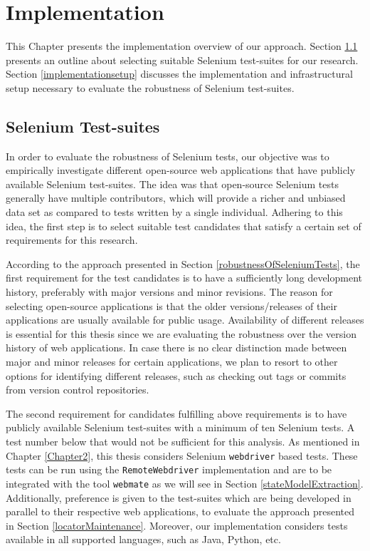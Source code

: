 \chapter{Implementation}
\label{Chapter4}

This Chapter presents the implementation overview of our approach. Section \ref{selectingCandidates} presents an outline about selecting suitable Selenium test-suites for our research. Section \ref{implementationsetup} discusses the implementation and infrastructural setup necessary to evaluate the robustness of Selenium test-suites. 


\section{Selenium Test-suites}
\label{selectingCandidates}
In order to evaluate the robustness of Selenium tests, our objective was to empirically investigate different open-source web applications that have publicly available Selenium test-suites. The idea was that open-source Selenium tests generally have multiple contributors, which will provide a richer and unbiased data set as compared to tests written by a single individual. Adhering to this idea, the first step is to select suitable test candidates that satisfy a certain set of requirements for this research. 

According to the approach presented in Section \ref{robustnessOfSeleniumTests}, the first requirement for the test candidates is to have a sufficiently long development history, preferably with major versions and minor revisions. The reason for selecting open-source applications is that the older versions/releases of their applications are usually available for public usage. Availability of different releases is essential for this thesis since we are evaluating the robustness over the version history of web applications. In case there is no clear distinction made between major and minor releases for certain applications, we plan to resort to other options for identifying different releases, such as checking out tags or commits from version control repositories. 

The second requirement for candidates fulfilling above requirements is to have publicly available Selenium test-suites with a minimum of ten Selenium tests. A test number below that would not be sufficient for this analysis. As mentioned in Chapter \ref{Chapter2}, this thesis considers Selenium \texttt{webdriver} based tests. These tests can be run using the \texttt{RemoteWebdriver} implementation and are to be integrated with the tool \texttt{webmate} as we will see in Section \ref{stateModelExtraction}. Additionally, preference is given to the test-suites which are being developed in parallel to their respective web applications, to evaluate the approach presented in Section \ref{locatorMaintenance}. Moreover, our implementation considers tests available in all supported languages, such as Java, Python, etc. 

